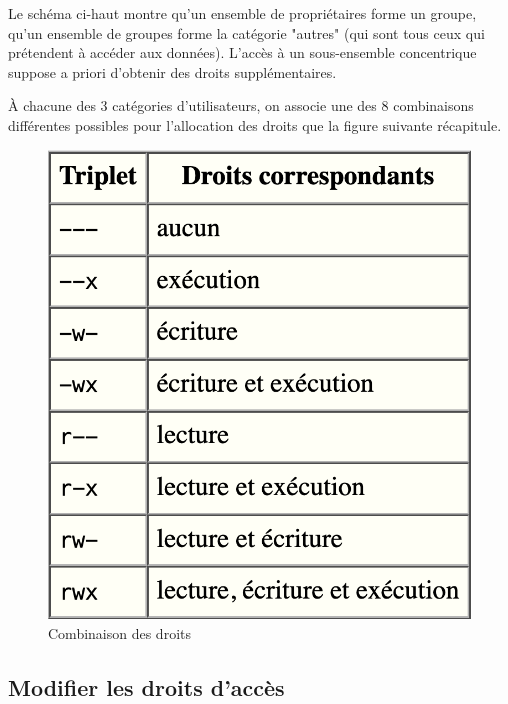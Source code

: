 \documentclass{article}
\begin{document}
\begin{exercice}
Le schéma ci-haut montre qu'un ensemble de propriétaires forme un groupe, qu'un ensemble de groupes forme la catégorie "autres" (qui sont tous ceux qui prétendent à accéder aux données).
L'accès à un sous-ensemble concentrique suppose a priori d'obtenir des droits supplémentaires. 

À chacune des 3 catégories d'utilisateurs, on associe une des 8 combinaisons différentes possibles pour l'allocation des droits que la figure suivante récapitule. 

\begin{figure}[h!]
    \begin{center}
    \includegraphics[scale=0.2]{ListeDroits.png}
    \caption{Combinaison des droits}
     \end{center}
\end{figure}    

\newpage

\end{exercice}

\hypertarget{Modifier les droits d'accès}{
\subsection{Modifier les droits d'accès}\label{Modifier les droits d'accès}}
\end{document}
